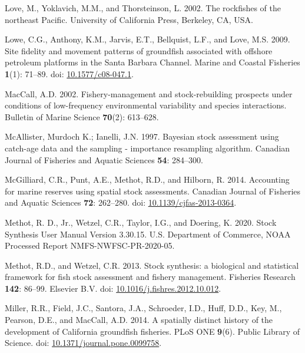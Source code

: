 \documentclass[
  english,
  a4paper,
]{article}
\newlength{\cslhangindent}
\newlength{\cslentryspacingunit} %
\newenvironment{CSLReferences}[2] %
 {%
  \setlength{\parindent}{0pt}
  \ifodd #1
  \let\oldpar\par
  \def\par{\hangindent=\cslhangindent\oldpar}
  \fi
  \setlength{\parskip}{#2\cslentryspacingunit}
 }%
 {}
\begin{document}
\begin{CSLReferences}{1}{0}
\leavevmode{}%
Love, M., Yoklavich, M.M., and Thorsteinson, L. 2002. {The rockfishes of the northeast Pacific}. University of California Press, Berkeley, CA, USA.

\leavevmode{}%
Lowe, C.G., Anthony, K.M., Jarvis, E.T., Bellquist, L.F., and Love, M.S. 2009. {Site fidelity and movement patterns of groundfish associated with offshore petroleum platforms in the Santa Barbara Channel}. Marine and Coastal Fisheries \textbf{1}(1): 71--89. doi: \href{https://doi.org/10.1577/c08-047.1}{10.1577/c08-047.1}.

\leavevmode{}%
MacCall, A.D. 2002. {Fishery-management and stock-rebuilding prospects under conditions of low-frequency environmental variability and species interactions}. Bulletin of Marine Science \textbf{70}(2): 613--628.

\leavevmode{}%
McAllister, Murdoch K.; Ianelli, J.N. 1997. {Bayesian stock assessment using catch-age data and the sampling - importance resampling algorithm}. Canadian Journal of Fisheries and Aquatic Sciences \textbf{54}: 284--300.

\leavevmode{}%
McGilliard, C.R., Punt, A.E., Methot, R.D., and Hilborn, R. 2014. {Accounting for marine reserves using spatial stock assessments}. Canadian Journal of Fisheries and Aquatic Sciences \textbf{72}: 262--280. doi: \href{https://doi.org/10.1139/cjfas-2013-0364}{10.1139/cjfas-2013-0364}.

\leavevmode{}%
Methot, R. D., Jr., Wetzel, C.R., Taylor, I.G., and Doering, K. 2020. {Stock Synthesis User Manual Version 3.30.15}. U.S. Department of Commerce, NOAA Processed Report NMFS-NWFSC-PR-2020-05.

\leavevmode{}%
Methot, R.D., and Wetzel, C.R. 2013. {Stock synthesis: a biological and statistical framework for fish stock assessment and fishery management}. Fisheries Research \textbf{142}: 86--99. Elsevier B.V. doi: \href{https://doi.org/10.1016/j.fishres.2012.10.012}{10.1016/j.fishres.2012.10.012}.

\leavevmode{}%
Miller, R.R., Field, J.C., Santora, J.A., Schroeder, I.D., Huff, D.D., Key, M., Pearson, D.E., and MacCall, A.D. 2014. {A spatially distinct history of the development of California groundfish fisheries}. PLoS ONE \textbf{9}(6). Public Library of Science. doi: \href{https://doi.org/10.1371/journal.pone.0099758}{10.1371/journal.pone.0099758}.


\end{CSLReferences}
\end{document}
